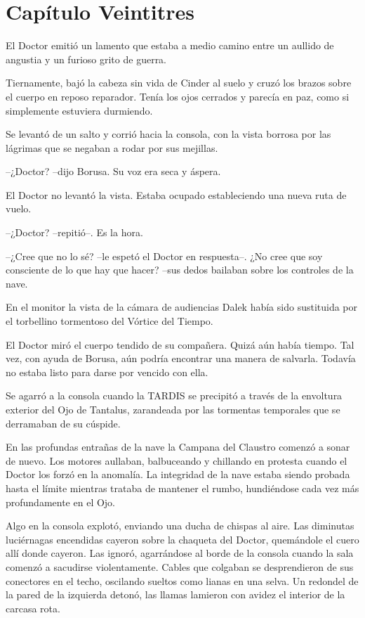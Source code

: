 \chapter*{Capítulo Veintitres}

El Doctor emitió un lamento que estaba a medio camino entre un aullido de angustia y un furioso grito de guerra.

Tiernamente, bajó la cabeza sin vida de Cinder al suelo y cruzó los brazos sobre el cuerpo en reposo reparador. Tenía los ojos cerrados y parecía en paz, como si simplemente estuviera durmiendo.

Se levantó de un salto y corrió hacia la consola, con la vista borrosa por las lágrimas que se negaban a rodar por sus mejillas.

--¿Doctor? --dijo Borusa. Su voz era seca y áspera.

El Doctor no levantó la vista. Estaba ocupado estableciendo una nueva ruta de vuelo.

--¿Doctor? --repitió--. Es la hora.

--¿Cree que no lo sé? --le espetó el Doctor en respuesta--. ¿No cree que soy consciente de lo que hay que hacer? --sus dedos bailaban sobre los controles de la nave.

En el monitor la vista de la cámara de audiencias Dalek había sido sustituida por el torbellino tormentoso del Vórtice del Tiempo.

El Doctor miró el cuerpo tendido de su compañera. Quizá aún había tiempo. Tal vez, con ayuda de Borusa, aún podría encontrar una manera de salvarla. Todavía no estaba listo para darse por vencido con ella.

Se agarró a la consola cuando la TARDIS se precipitó a través de la envoltura exterior del Ojo de Tantalus, zarandeada por las tormentas temporales que se derramaban de su cúspide.

En las profundas entrañas de la nave la Campana del Claustro comenzó a sonar de nuevo. Los motores aullaban, balbuceando y chillando en protesta cuando el Doctor los forzó en la anomalía. La integridad de la nave estaba siendo probada hasta el límite mientras trataba de mantener el rumbo, hundiéndose cada vez más profundamente en el Ojo.

Algo en la consola explotó, enviando una ducha de chispas al aire. Las diminutas luciérnagas encendidas cayeron sobre la chaqueta del Doctor, quemándole el cuero allí donde cayeron. Las ignoró, agarrándose al borde de la consola cuando la sala comenzó a sacudirse violentamente. Cables que colgaban se desprendieron de sus conectores en el techo, oscilando sueltos como lianas en una selva. Un redondel de la pared de la izquierda detonó, las llamas lamieron con avidez el interior de la carcasa rota.

